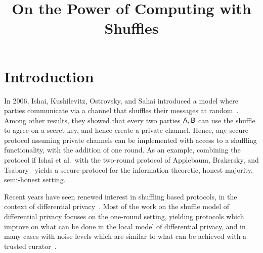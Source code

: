 \documentclass[11pt]{article}
\title{On the Power of Computing with Shuffles
\Draft{\\{\small \sc Working Draft: Please Please Please Do Not Distribute}}}
\author{}
\begin{document}
	\sloppy
	  \maketitle

\begin{abstract}
\end{abstract}


\section{Introduction}

In 2006, Ishai, Kushilevitz, Ostrovsky, and Sahai introduced a model where parties communicate via a channel that shuffles their messages at random~\cite{}. Among other results, they showed that every two parties $\mathsf{A},\mathsf{B}$ can use the shuffle to agree on a secret key, and hence create a private channel. Hence, any secure protocol assuming private channels can be implemented with access to a shuffling functionality, with the addition of one round. As an example, combining the protocol if Ishai et al.\ with the two-round protocol of Applebaum, Brakersky, and Tsabary~\cite{} yields a secure protocol for the information theoretic, honest majority, semi-honest setting.

Recent years have seen renewed interest in shuffling based protocols, in the context of  differential privacy~\cite{}. Most of the work on the shuffle model of differential privacy focuses on the one-round setting, yielding protocols which improve on what can be done in the local model of differential privacy, and in many cases with noise levels which are similar to what can be achieved with a trusted curator~\cite{}. 
\end{document}
